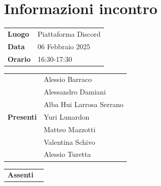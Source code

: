 \section{Informazioni incontro}
\vspace{0.25cm}
\begin{tabular}{p{1.75cm} | l}
    \textbf{Luogo} & Piattaforma Discord\\
    \textbf{Data} & 06 Febbraio 2025\\
    \textbf{Orario} & 16:30-17:30\\
\end{tabular}

\vspace{0.5cm}
\noindent
\begin{tabular}{p{1.75cm} | l}
    \multirow{7}{*}{\textbf{Presenti}}
        & Alessio Barraco\\
        & Alessandro Damiani \\ %
        & Alba Hui Larrosa Serrano\\
        & Yuri Lunardon\\
        & Matteo Mazzotti\\
        & Valentina Schivo\\
        & Alessio Turetta
\end{tabular}

\vspace{0.5cm}
\noindent
\begin{tabular}{p{1.75cm} | l}
    \multirow{1}{*}{\textbf{Assenti}}
\end{tabular}

